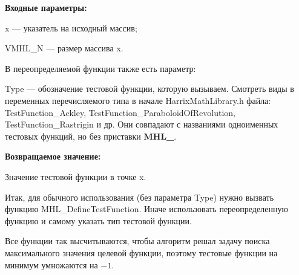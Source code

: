 \textbf{Входные параметры:}

x --- указатель на исходный массив;

VMHL\_N --- размер массива x.

В переопределяемой функции также есть параметр:
  
Type --- обозначение тестовой функции, которую вызываем.
Смотреть виды в переменных перечисляемого типа в начале HarrixMathLibrary.h файла: TestFunction\_Ackley, TestFunction\_ParaboloidOfRevolution, TestFunction\_Rastrigin и др. Они совпадают с названиями одноименных тестовых функций, но без приставки \textbf{MHL\_}.

\textbf{Возвращаемое значение:}
 
Значение тестовой функции в точке x.

Итак, для обычного использования (без параметра Type) нужно вызвать функцию MHL\_DefineTestFunction. Иначе использовать переопределенную функцию и самому указать тип тестовой функции.

Все функции так высчитываются, чтобы алгоритм решал задачу поиска максимального значения целевой функции, поэтому тестовые функции на минимум умножаются на $-1$.
